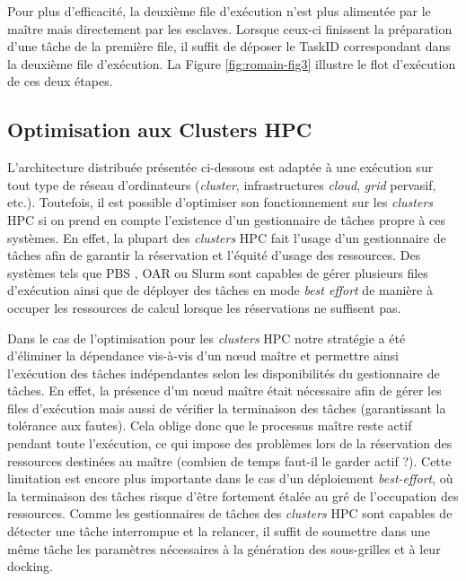 Pour plus d'efficacité, la deuxième file d'exécution n'est plus alimentée par le maître mais directement par les esclaves. Lorsque ceux-ci finissent la préparation d'une tâche de la première file, il suffit de déposer le TaskID correspondant dans la deuxième file d'exécution. La Figure \ref{fig:romain-fig3} illustre le flot d'exécution de ces deux étapes.  


\subsection{Optimisation aux Clusters HPC}

 L'architecture distribuée présentée ci-dessous est adaptée à une exécution sur tout type de réseau d'ordinateurs (\textit{cluster}, infrastructures \textit{cloud}, \textit{grid} pervasif, etc.). Toutefois, il est possible d'optimiser son fonctionnement sur les \textit{clusters} HPC si on prend en compte l'existence d'un gestionnaire de tâches propre à ces systèmes. En effet, la plupart des \textit{clusters} HPC fait l'usage d'un gestionnaire de tâches afin de garantir la réservation et l'équité d'usage des ressources. Des systèmes tels que PBS \cite{Henderson95}, OAR \cite{Capit2005} ou Slurm \cite{Yoo2003} sont capables de gérer plusieurs files d'exécution ainsi que de déployer des tâches en mode \textit{best effort} de manière à occuper les ressources de calcul lorsque les réservations ne suffisent pas. 
 
 Dans le cas de l'optimisation pour les \textit{clusters} HPC notre stratégie a été d'éliminer la dépendance vis-à-vis d'un n{\oe}ud maître et permettre ainsi l'exécution des tâches indépendantes selon les disponibilités du gestionnaire de tâches. En effet, la présence d'un n{\oe}ud maître était nécessaire afin de gérer les files d'exécution mais aussi de vérifier la terminaison des tâches (garantissant la tolérance aux fautes). Cela oblige donc que le processus maître reste actif pendant toute l'exécution, ce qui impose des problèmes lors de la réservation des ressources destinées au maître (combien de temps faut-il le garder actif ?). Cette limitation est encore plus importante dans le cas d'un déploiement \textit{best-effort}, où la terminaison des tâches risque d'être fortement étalée au gré de l'occupation des ressources. Comme les gestionnaires de tâches des \textit{clusters} HPC sont capables de détecter une tâche interrompue et la relancer, il suffit de soumettre dans une même tâche les paramètres nécessaires à la génération des sous-grilles et à leur docking. 
 
